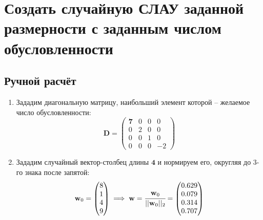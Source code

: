 


\setcounter{page}{2}
\tableofcontents
\listoffigures
\clearpage
\section{Создать случайную СЛАУ заданной размерности с заданным числом обусловленности}
\subsection{Ручной расчёт}
\begin{enumerate}
\item Зададим диагональную матрицу, наибольший элемент которой -- желаемое число обусловленности:
\begin{equation}
    \mathbf{D} =
    \begin{pmatrix}
        \mathbf{7} & 0 & 0 & 0 \\
        0 & 2 & 0 & 0 \\
        0 & 0 & 1 & 0 \\
        0 & 0 & 0 & -2
    \end{pmatrix}
\end{equation}

\item Зададим случайный вектор-столбец длины $\mathbf{4}$ и нормируем его, округляя до 3-го знака после запятой:
\begin{equation}
    \mathbf{w}_0 =
    \begin{pmatrix} 8\\ 1\\ 4\\ 9 \end{pmatrix} \implies
    \mathbf{w} = \cfrac{\mathbf{w}_0}{||\mathbf{w}_0||_2} =
    \begin{pmatrix} 0.629\\0.079\\0.314\\0.707\end{pmatrix}
\end{equation}


\end{enumerate}
